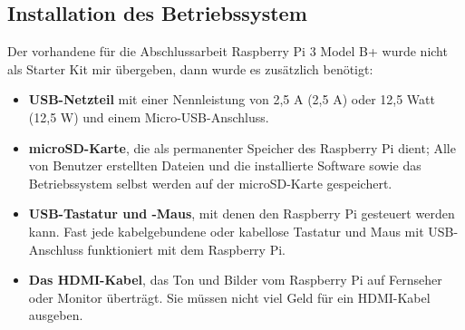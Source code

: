 \subsection{Installation des Betriebssystem}
\label{sec:register_client:raspbian}
Der vorhandene für die Abschlussarbeit Raspberry Pi 3 Model B+ wurde nicht als Starter Kit mir übergeben, dann wurde es zusätzlich benötigt\cite[pp. 21-22]{gareth:raspi}: 
\begin{itemize}
	\item \textbf{USB-Netzteil} mit einer Nennleistung von 2,5 A (2,5 A) oder 12,5 Watt (12,5 W) und einem Micro-USB-Anschluss. 
	\item \textbf{microSD-Karte}, die als permanenter Speicher des Raspberry Pi dient; Alle von Benutzer erstellten Dateien und die installierte Software sowie das Betriebssystem selbst werden auf der microSD-Karte gespeichert.
	\item \textbf{USB-Tastatur und -Maus}, mit denen den Raspberry Pi gesteuert werden kann. Fast jede kabelgebundene oder kabellose Tastatur und Maus mit USB-Anschluss funktioniert mit dem Raspberry Pi.
	\item \textbf{Das HDMI-Kabel}, das Ton und Bilder vom Raspberry Pi auf Fernseher oder Monitor überträgt. Sie müssen nicht viel Geld für ein HDMI-Kabel ausgeben. 
\end{itemize}

